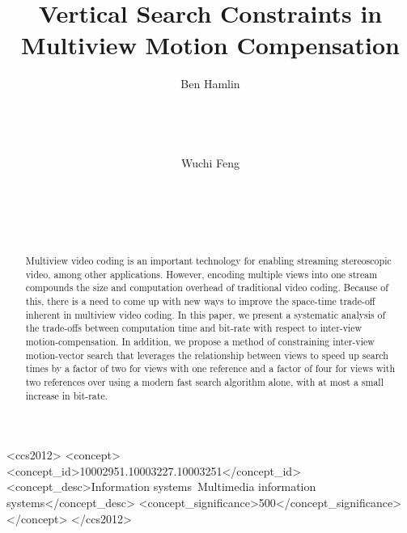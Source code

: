 \documentclass{sig-alternate-05-2015}
\begin{document}
\doi{}
\isbn{}

\title{Vertical Search Constraints in Multiview Motion Compensation}
\author{
\alignauthor
Ben Hamlin\\
       \\
       \\
       \\
       \\
\alignauthor
Wuchi Feng\\
       \\
       \\
       \\
       \\
}

\maketitle

\begin{abstract}
Multiview video coding is an important technology for enabling streaming
stereoscopic video, among other applications. However, encoding multiple
views into one stream compounds the size and computation overhead of
traditional video coding. Because of this, there is a need to come up with new
ways to improve the space-time trade-off inherent in multiview video coding. In
this paper, we present a systematic analysis of the trade-offs between
computation time and bit-rate with respect to inter-view motion-compensation.
In addition, we propose a method of constraining inter-view motion-vector search
that leverages the relationship between views to speed up search times by a factor
of two for views with one reference and a factor of four for views with two
references over using a modern fast search algorithm alone, with at most a small
increase in bit-rate.
\end{abstract}

\begin{CCSXML}
<ccs2012>
<concept>
<concept_id>10002951.10003227.10003251</concept_id>
<concept_desc>Information systems~Multimedia information systems</concept_desc>
<concept_significance>500</concept_significance>
</concept>
</ccs2012>
\end{CCSXML}
\printccsdesc
\end{document}
